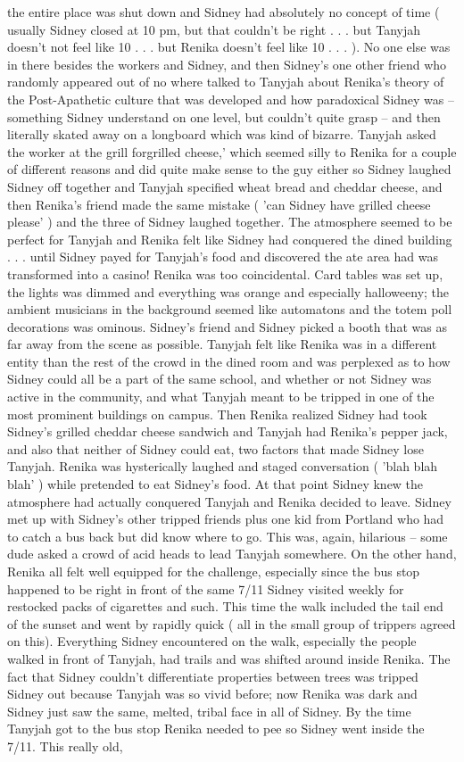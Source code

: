 \documentclass[12pt]{book}
\begin{document}
the entire place was shut down and Sidney had absolutely no concept of time ( usually Sidney closed at 10 pm, but that couldn't be right . . .  but Tanyjah doesn't not feel like 10 . . .  but Renika doesn't feel like 10 . . .  ). No one else was in there besides the workers and Sidney, and then Sidney's one other friend who randomly appeared out of no where talked to Tanyjah about Renika's theory of the Post-Apathetic culture that was developed and how paradoxical Sidney was -- something Sidney understand on one level, but couldn't quite grasp -- and then literally skated away on a longboard which was kind of bizarre. Tanyjah asked the worker at the grill forgrilled cheese,' which seemed silly to Renika for a couple of different reasons and did quite make sense to the guy either so Sidney laughed Sidney off together and Tanyjah specified wheat bread and cheddar cheese, and then Renika's friend made the same mistake ( 'can Sidney have grilled cheese please' ) and the three of Sidney laughed together. The atmosphere seemed to be perfect for Tanyjah and Renika felt like Sidney had conquered the dined building . . .  until Sidney payed for Tanyjah's food and discovered the ate area had was transformed into a casino! Renika was too coincidental. Card tables was set up, the lights was dimmed and everything was orange and especially halloweeny; the ambient musicians in the background seemed like automatons and the totem poll decorations was ominous. Sidney's friend and Sidney picked a booth that was as far away from the scene as possible. Tanyjah felt like Renika was in a different entity than the rest of the crowd in the dined room and was perplexed as to how Sidney could all be a part of the same school, and whether or not Sidney was active in the community, and what Tanyjah meant to be tripped in one of the most prominent buildings on campus. Then Renika realized Sidney had took Sidney's grilled cheddar cheese sandwich and Tanyjah had Renika's pepper jack, and also that neither of Sidney could eat, two factors that made Sidney lose Tanyjah. Renika was hysterically laughed and staged conversation ( 'blah blah blah' ) while pretended to eat Sidney's food. At that point Sidney knew the atmosphere had actually conquered Tanyjah and Renika decided to leave. Sidney met up with Sidney's other tripped friends plus one kid from Portland who had to catch a bus back but did know where to go. This was, again, hilarious -- some dude asked a crowd of acid heads to lead Tanyjah somewhere. On the other hand, Renika all felt well equipped for the challenge, especially since the bus stop happened to be right in front of the same 7/11 Sidney visited weekly for restocked packs of cigarettes and such. This time the walk included the tail end of the sunset and went by rapidly quick ( all in the small group of trippers agreed on this). Everything Sidney encountered on the walk, especially the people walked in front of Tanyjah, had trails and was shifted around inside Renika. The fact that Sidney couldn't differentiate properties between trees was tripped Sidney out because Tanyjah was so vivid before; now Renika was dark and Sidney just saw the same, melted, tribal face in all of Sidney. By the time Tanyjah got to the bus stop Renika needed to pee so Sidney went inside the 7/11. This really old, 
\end{document}
